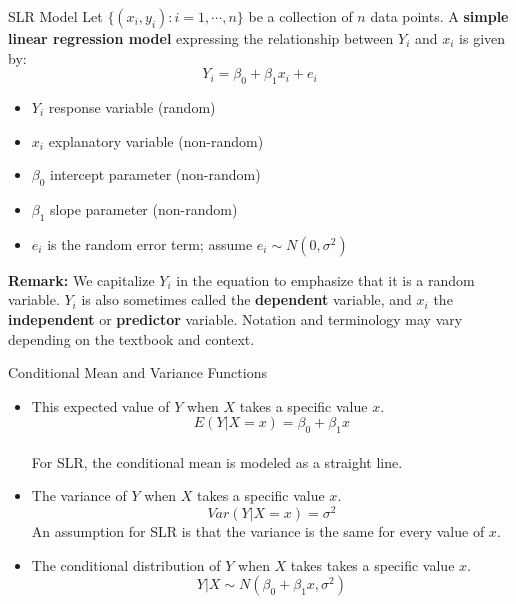 \documentclass[10pt]{beamer}
\begin{document}
\begin{frame}{SLR Model}
Let $\{ (x_i, y_i) : i=1, \cdots, n \}$ be a collection of $n$ data points.  A \textbf{simple linear regression model} expressing the relationship between $Y_i$ and $x_i$ is given by:
$$ Y_i = \beta_0 + \beta_1 x_i + e_i $$
\begin{itemize}
\item $Y_i$ response variable (random)
\item $x_i$ explanatory variable (non-random)
\item $\beta_0$ intercept parameter (non-random)
\item $\beta_1$ slope parameter (non-random)
\item $e_i$ is the random error term; assume $e_i \sim N(0, \sigma^2)$\\ 
\end{itemize}
\vspace{10pt}

\footnotesize
\textbf{Remark:}  We capitalize $Y_i$ in the equation to emphasize that it is a random variable.  $Y_i$ is also sometimes called the \textbf{dependent} variable, and $x_i$ the \textbf{independent} or \textbf{predictor} variable.  Notation and terminology may vary depending on the textbook and context.
\end{frame}

\begin{frame}{Conditional Mean and Variance Functions}
\begin{itemize}
\item This expected value of $Y$ when $X$ takes a specific value $x$.
$$E(Y| X=x) = \beta_0 + \beta_1 x$$\\
For SLR, the conditional mean is modeled as a straight line. 
\vspace{5pt}

\item The variance of $Y$ when $X$ takes a specific value $x$.
$$Var(Y| X=x) = \sigma^2$$
An assumption for SLR is that the variance is the same for every value of $x$.  
\vspace{5pt}

\item The conditional distribution of $Y$ when $X$ takes takes a specific value $x$.
$$Y|X \sim N(\beta_0 + \beta_1 x, \sigma^2)$$
\end{itemize}
\end{frame}
\end{document}
